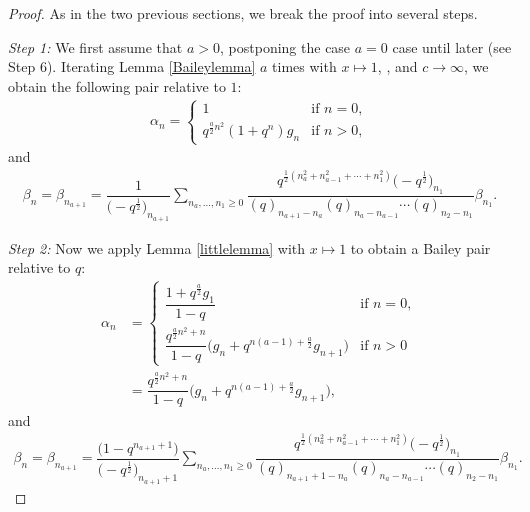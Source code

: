 \documentclass[pdftex]{sigma}
\numberwithin{equation}{section}
\begin{document}
\begin{proof}
As in the two previous sections, we break the proof into several steps.


{\it Step 1\emph{:}} We first assume that $a>0$, postponing the case $a=0$ case until later (see Step 6).
Iterating Lemma \ref{Baileylemma} $a$ times with $x\mapsto 1$, , and $c\rightarrow \infty$, we obtain the following pair relative to $1$:
\begin{align}
	\alpha_n =
	\begin{cases}
		1 & \text{if $n=0$}, \\
		q^{\frac{a}{2}n^2}(1+q^n)g_n & \text{if $n>0$},
	\end{cases}
	\label{eqn:alphathm1.6step1}
\end{align}
and
\begin{align}
	\beta_n =\beta_{n_{a+1}}
	=\dfrac{1}{\bigl(-q^{\frac{1}{2}}\bigr)_{n_{a+1}}}\sum_{n_{a},\dots,n_1\geq 0}
	\dfrac{q^{\frac{1}{2}(n_{a}^2+n_{a-1}^2+\cdots+n_1^2)}\bigl(-q^{\frac{1}{2}}\bigr)_{n_1}}{(q)_{n_{a+1}-n_{a}}
		(q)_{n_{a}-n_{a-1}}
		\cdots
		(q)_{n_{2}-n_{1}}} \beta_{n_1}.
	\label{eqn:betathm1.6step1}
\end{align}


{\it Step 2\emph{:}}
Now we apply Lemma \ref{littlelemma} with $x \mapsto 1$ to obtain a Bailey pair relative to $q$:
\begin{align*}
	\alpha_{n} &{}=
	\begin{cases}
		\dfrac{1 + q^{\frac{a}{2}}g_1}{1-q} 	 & \text{if $n=0$}, \\
		\dfrac{q^{\frac{a}{2}n^2 + n}}{1-q}\bigl(g_n + q^{n(a-1) + \frac{a}{2}}g_{n+1} \bigr) & \text{if $n > 0$}
	\end{cases}
	\\
	&{}=
	\dfrac{q^{\frac{a}{2}n^2 + n}}{1-q}\bigl(g_n + q^{n(a-1) + \frac{a}{2}}g_{n+1} \bigr),
\end{align*}
and
\begin{align*}
	\beta_n =\beta_{n_{a+1}}
	=\dfrac{\bigl(1-q^{n_{a+1}+1}\bigr)}{\bigl(-q^{\frac{1}{2}}\bigr)_{n_{a+1}+1}}\sum_{n_{a},\dots,n_1\geq 0}
	\dfrac{q^{\frac{1}{2}(n_{a}^2+n_{a-1}^2+\cdots+n_1^2)}\bigl(-q^{\frac{1}{2}}\bigr)_{n_1}}{(q)_{n_{a+1}+1-n_{a}}
		(q)_{n_{a}-n_{a-1}}
		\cdots
		(q)_{n_{2}-n_{1}}} \beta_{n_1}.
\end{align*}



\end{proof}
\end{document}
